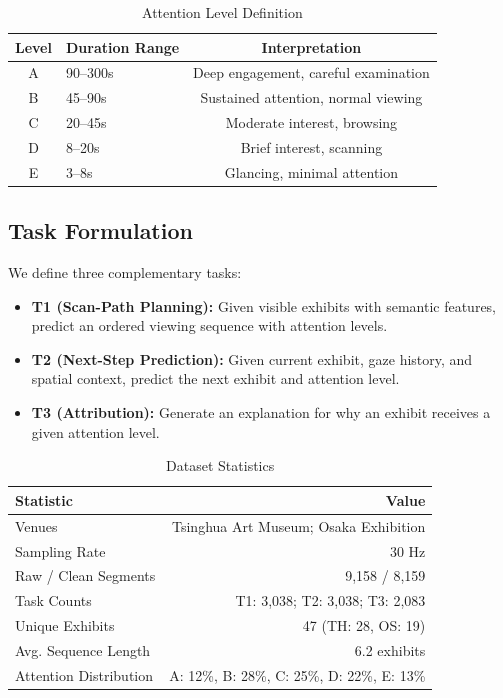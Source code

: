 \documentclass[letterpaper]{article}
\begin{document}
\begin{table}[h]
\centering
\caption{Attention Level Definition}
\begin{tabular}{clc}
\toprule
Level & Duration Range & Interpretation \\
\midrule
A & 90--300s & Deep engagement, careful examination \\
B & 45--90s & Sustained attention, normal viewing \\
C & 20--45s & Moderate interest, browsing \\
D & 8--20s & Brief interest, scanning \\
E & 3--8s & Glancing, minimal attention \\
\bottomrule
\end{tabular}
\end{table}

\subsection{Task Formulation}

We define three complementary tasks:

\begin{itemize}
    \item \textbf{T1 (Scan-Path Planning):} Given visible exhibits with semantic features, predict an ordered viewing sequence with attention levels.
    \item \textbf{T2 (Next-Step Prediction):} Given current exhibit, gaze history, and spatial context, predict the next exhibit and attention level.
    \item \textbf{T3 (Attribution):} Generate an explanation for why an exhibit receives a given attention level.
\end{itemize}

\begin{table}[h]
\centering
\caption{Dataset Statistics}
\begin{tabular}{lr}
\toprule
Statistic & Value \\
\midrule
Venues & Tsinghua Art Museum; Osaka Exhibition \\
Sampling Rate & 30 Hz \\
Raw / Clean Segments & 9,158 / 8,159 \\
Task Counts & T1: 3,038; T2: 3,038; T3: 2,083 \\
Unique Exhibits & 47 (TH: 28, OS: 19) \\
Avg. Sequence Length & 6.2 exhibits \\
Attention Distribution & A: 12\%, B: 28\%, C: 25\%, D: 22\%, E: 13\% \\
\bottomrule
\end{tabular}
\label{tab:dataset}
\end{table}
\end{document}
